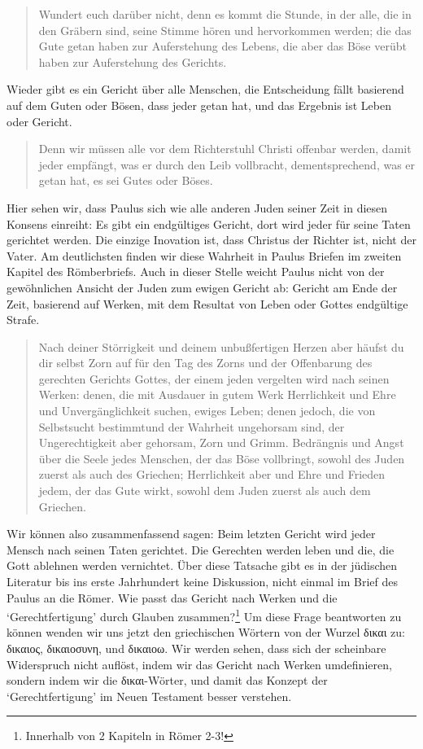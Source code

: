 \begin{quote}
	Wundert euch darüber nicht, denn es kommt die Stunde, in der alle, die in den Gräbern sind, seine Stimme hören
	und hervorkommen werden; die das Gute getan haben zur Auferstehung des Lebens,
	die aber das Böse verübt haben zur Auferstehung des Gerichts.
\end{quote}
Wieder gibt es ein Gericht über alle Menschen, die Entscheidung fällt basierend auf dem Guten oder Bösen, dass jeder getan hat, und das Ergebnis ist Leben oder Gericht.

\begin{quote}
	Denn wir müssen alle vor dem Richterstuhl Christi offenbar werden,
	damit jeder empfängt, was er durch den Leib \textlangle vollbracht\textrangle,
	dementsprechend, was er getan hat, es sei Gutes oder Böses.
\end{quote}
Hier sehen wir, dass Paulus sich wie alle anderen Juden seiner Zeit in diesen Konsens einreiht:
Es gibt ein endgültiges Gericht, dort wird jeder für seine Taten
gerichtet werden. Die einzige Inovation ist, dass Christus der Richter ist, nicht der Vater.
Am deutlichsten finden wir diese Wahrheit in Paulus Briefen im zweiten Kapitel des Römberbriefs.
Auch in dieser Stelle weicht Paulus nicht von der gewöhnlichen Ansicht der Juden zum ewigen Gericht ab: 
Gericht am Ende der Zeit, basierend auf Werken, mit dem Resultat von Leben oder Gottes endgültige Strafe.

\begin{quote}
	Nach deiner Störrigkeit und deinem unbußfertigen Herzen aber häufst du dir selbst Zorn auf für den Tag des Zorns und der Offenbarung des gerechten Gerichts Gottes,
	der einem jeden vergelten wird nach seinen Werken:
	denen, die mit Ausdauer in gutem Werk Herrlichkeit und Ehre und Unvergänglichkeit suchen, ewiges Leben;
	denen jedoch, die von Selbstsucht \textlangle bestimmt\textrangle und der Wahrheit ungehorsam sind, der Ungerechtigkeit aber gehorsam, Zorn und Grimm.
	Bedrängnis und Angst über die Seele jedes Menschen, der das Böse vollbringt, sowohl des Juden zuerst als auch des Griechen;
	Herrlichkeit aber und Ehre und Frieden jedem, der das Gute wirkt, sowohl dem Juden zuerst als auch dem Griechen.
\end{quote}

Wir können also zusammenfassend sagen:
Beim letzten Gericht wird jeder Mensch nach seinen Taten gerichtet. Die Gerechten werden leben und die, die Gott ablehnen werden vernichtet.
Über diese Tatsache gibt es in der jüdischen Literatur bis ins erste Jahrhundert keine Diskussion, nicht einmal im Brief des Paulus an die Römer.
Wie passt das Gericht nach Werken und die `Gerechtfertigung' durch Glauben zusammen?\footnote{
	Innerhalb von 2 Kapiteln in Römer 2-3!
}
Um diese Frage beantworten zu können wenden wir uns jetzt den griechischen Wörtern von der Wurzel δικαι zu: δικαιος, δικαιοσυνη, und δικαιοω.
Wir werden sehen, dass sich der scheinbare Widerspruch nicht auflöst, indem wir das Gericht nach Werken umdefinieren, sondern indem
wir die δικαι-Wörter, und damit das Konzept der `Gerechtfertigung' im Neuen Testament besser verstehen.

